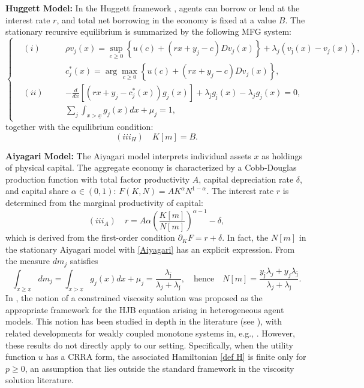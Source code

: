\documentclass[11pt]{article}
\numberwithin{equation}{section}
\theoremstyle{Claim}
\newcommand{\ux}{{\underline x}}
\newcommand{\beq}{\begin{equation}}
\newcommand{\eeq}{\end{equation}}
\theoremstyle{plain}
\begin{document}
\textbf{Huggett Model:} In the Huggett framework \cite{huggett1993risk}, agents can borrow or lend at the interest rate $r$, and total net borrowing in the economy is fixed at a value $B$. The stationary recursive equilibrium is summarized by the following MFG system:
\begin{equation}\label{MFG}
	\left\{
\begin{aligned}
	&(i) \quad && \rho v_j(x) = \sup_{c \ge 0} \left\{ u(c) + (r x + y_j - c) Dv_j(x) \right\} + \lambda_j (v_{\bar{\jmath}}(x) - v_j(x)), \\
	&&& c_j^*(x) = \arg\max_{c \ge 0} \left\{ u(c) + (r x + y_j - c) Dv_j(x) \right\}, \\
	&(ii) \quad && - \frac{d}{dx} \left[ (r x + y_j - c_j^*(x)) g_j(x) \right] + \lambda_{\bar \jmath} g_{\bar \jmath}(x) - \lambda_j g_j(x) = 0, \\
	&&& \sum_j\int_{x>\ux}g_j(x)dx+\mu_j=1,
\end{aligned}
\right.
\end{equation}
together with the equilibrium condition:
\begin{equation}\label{Huggett}
	(iii_H) \quad K[m] = B.
\end{equation}
\par
\textbf{Aiyagari Model:}
The Aiyagari model interprets individual assets $x$ as holdings of physical capital. The aggregate economy is characterized by a Cobb-Douglas production function with total factor productivity $A$, capital depreciation rate $\delta$, and capital share $\alpha \in (0,1)$:
$
F(K, N) = A K^\alpha N^{1 - \alpha}.
$
The interest rate $r$ is determined from the marginal productivity of capital:
\begin{equation}\label{Aiyagari}	
(iii_A) \quad r = A \alpha \left( \frac{K[m]}{N[m]} \right)^{\alpha - 1} - \delta, 
\end{equation}
which is derived from the first-order condition $\partial_K F = r + \delta$. In fact, the $N[m]$ in the stationary Aiyagari model with \eqref{Aiyagari} has an explicit expression. From \cite[Eq. (32), p. 64]{achdou2022income} the measure $dm_j$ satisfies 
\beq\label{Ng}
\int_{x\geq \ux}dm_j=\int_{x>\ux}g_j(x)dx+\mu_j= \frac{\lambda_{\bar \jmath}}{\lambda_j + \lambda_{\bar \jmath}}, \quad \text{hence} \quad
N[m] = \frac{y_{\bar \jmath} \lambda_j + y_j \lambda_{\bar \jmath}}{\lambda_j + \lambda_{\bar \jmath}}.
\eeq
In \cite{achdou2022income}, the notion of a  constrained viscosity solution  was proposed as the appropriate framework for the HJB equation arising in heterogeneous agent models. This notion has been studied in depth in the literature (see \cite{alvarez1997convex, bardi1997optimal, capuzzo1990hamilton, Soner_1986}), with related developments for weakly coupled monotone systems in, e.g., \cite{ishii1991viscosity}. However, these results do not directly apply to our setting. Specifically, when the utility function $u$ has a CRRA form, the associated Hamiltonian \eqref{def H} is finite only for $p \geq 0$, an assumption that lies outside the standard framework in the viscosity solution literature.
\end{document}
